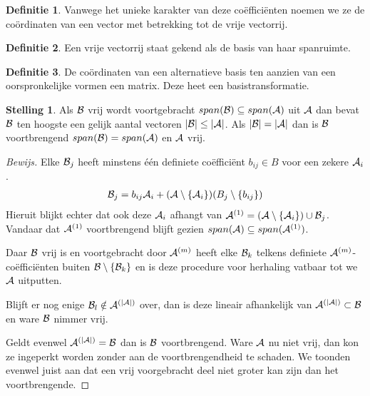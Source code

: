\documentclass{amsart}
\theoremstyle{definition}
\newtheorem{thm}{Stelling}[section]
\newtheorem{dfn}{Definitie}[section]
\newenvironment{bewijs}{\begin{proof}[Bewijs]}{\end{proof}}
\newcommand{\setsm}[1]{\{{#1}\}}
\newcommand{\without}[1]{\setminus\setsm{#1}}
\newcommand{\abs}[1]{\lvert{#1}\rvert}
\newcommand{\vecrow}[1][a]{\mathcal{\MakeUppercase{#1}}}
\newcommand{\rvec}[2][i]{{#2}_{#1}}
\newcommand{\rvecr}[2][i]{\rvec[#1]{\vecrow[#2]}}
\begin{document}
\begin{dfn}
	Vanwege het unieke karakter van deze coëfficiënten noemen we ze de coördinaten van een vector met betrekking tot de vrije vectorrij.
\end{dfn}

\begin{dfn}
	Een vrije vectorrij staat gekend als de basis van haar spanruimte.
\end{dfn}

\begin{dfn}
	De coördinaten van een alternatieve basis ten aanzien van een oorspronkelijke vormen een matrix.
	Deze heet een basistransformatie.
\end{dfn}

\begin{thm}
	Als $\vecrow[b]$ vrij wordt voortgebracht $span(\vecrow[b]) \subseteq span(\vecrow)$ uit $\vecrow$ dan bevat $\vecrow[b]$ ten hoogste een gelijk aantal vectoren $\abs{\vecrow[b]} \leq \abs\vecrow$.
	Als $\abs{\vecrow[b]} = \abs\vecrow$ dan is $\vecrow[b]$ voortbrengend $span(\vecrow[b]) = span(\vecrow)$ en $\vecrow$ vrij. 
	\begin{bewijs}
		Elke $\vecrow[b]_j$ heeft minstens één definiete coëfficiënt $b_{ij} \in B$ voor een zekere $\vecrow_i$.
		\begin{align*}
			\vecrow[b]_j = b_{ij}\vecrow_i + (\vecrow \without{\vecrow_i})(B_j  \without{b_{ij}}) 
		\end{align*}
		Hieruit blijkt echter dat ook deze $\vecrow_i$ afhangt van  $\vecrow^{(1)} = \left(\vecrow \without{\vecrow_i}\right) \cup \rvecr[j]{b}$.
		Vandaar dat $\vecrow^{(1)}$ voortbrengend blijft gezien $span(\vecrow) \subseteq span(\vecrow^{(1)})$.

		Daar $\vecrow[b]$ vrij is en voortgebracht door $\vecrow^{(m)}$ heeft elke $\rvecr[k]{b}$ telkens definiete $\vecrow^{(m)}$-coëfficiënten buiten $\vecrow[b] \without{\rvecr[k]{b}}$
		en is deze procedure voor herhaling vatbaar tot we $\vecrow$ uitputten.

		Blijft er nog enige $\vecrow[b]_l \notin \vecrow^{(\abs{\vecrow})}$ over,
		dan is deze lineair afhankelijk van $\vecrow^{(\abs\vecrow)} \subset \vecrow[b]$ en ware $\vecrow[b]$ nimmer vrij.

		Geldt evenwel $\vecrow^{(\abs{\vecrow})} = \vecrow[b]$ dan is $\vecrow[b]$ voortbrengend.
		Ware $\vecrow$ nu niet vrij, dan kon ze ingeperkt worden zonder aan de voortbrengendheid te schaden.
		We toonden evenwel juist aan dat een vrij voorgebracht deel niet groter kan zijn dan het voortbrengende.
	\end{bewijs}
\end{thm}
\end{document}

